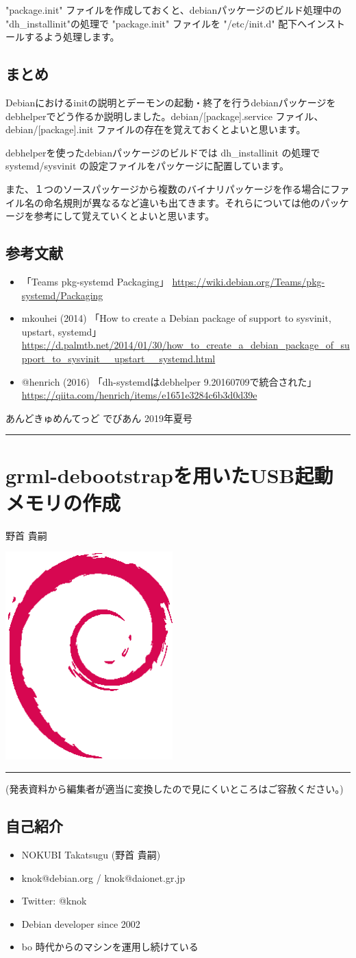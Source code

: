 \documentclass[mingoth,a4paper]{jsarticle}
\renewcommand{\dancersection}[2]{%
\newpage
あんどきゅめんてっど でびあん 2019年夏号
%
\vspace{0.1mm}\\
{\color{dancerdarkblue}\rule{\hsize}{2mm}}

%
%
\begin{minipage}[t]{0.6\hsize}
\color{dancerdarkblue}
\vspace{1cm}
\section{#1}
\hfill{}#2\\
\end{minipage}
\begin{minipage}[t]{0.4\hsize}
\vspace{-2cm}
\hfill{}\includegraphics[height=8cm]{image200502/openlogo-nd.eps}\\
\vspace{-5cm}
\end{minipage}
%
{\color{dancerlightblue}\rule{0.66\hsize}{2mm}}
%
\vspace{2cm}
}
\begin{document}
"package.init" ファイルを作成しておくと、debianパッケージのビルド処理中の "dh\_installinit"の処理で "package.init" ファイルを "/etc/init.d" 配下へインストールするよう処理します。


\subsection{まとめ}

Debianにおけるinitの説明とデーモンの起動・終了を行うdebianパッケージをdebhelperでどう作るか説明しました。debian/[package].service ファイル、debian/[package].init ファイルの存在を覚えておくとよいと思います。


debhelperを使ったdebianパッケージのビルドでは  dh\_installinit の処理で systemd/sysvinit の設定ファイルをパッケージに配置しています。


また、１つのソースパッケージから複数のバイナリパッケージを作る場合にファイル名の命名規則が異なるなど違いも出てきます。それらについては他のパッケージを参考にして覚えていくとよいと思います。


\subsection{参考文献}

\begin{itemize}
\item 「Teams pkg-systemd Packaging」 \url{https://wiki.debian.org/Teams/pkg-systemd/Packaging}
\item mkouhei (2014) 「How to create a Debian package of support to sysvinit, upstart, systemd」 \url{https://d.palmtb.net/2014/01/30/how_to_create_a_debian_package_of_support_to_sysvinit__upstart__systemd.html}
\item @henrich (2016) 「dh-systemdはdebhelper 9.20160709で統合された」 \url{https://qiita.com/henrich/items/e1651e3284c6b3d0d39e}
\end{itemize}

\dancersection{grml-debootstrapを用いたUSB起動メモリの作成}{野首 貴嗣}

(発表資料から編集者が適当に変換したので見にくいところはご容赦ください。)

\subsection{自己紹介}

  \begin{itemize}
  \item NOKUBI Takatsugu (野首 貴嗣)
  \item knok@debian.org / knok@daionet.gr.jp
  \item Twitter: @knok
  \item Debian developer since 2002
  \item bo 時代からのマシンを運用し続けている
  \end{itemize}
\end{document}
